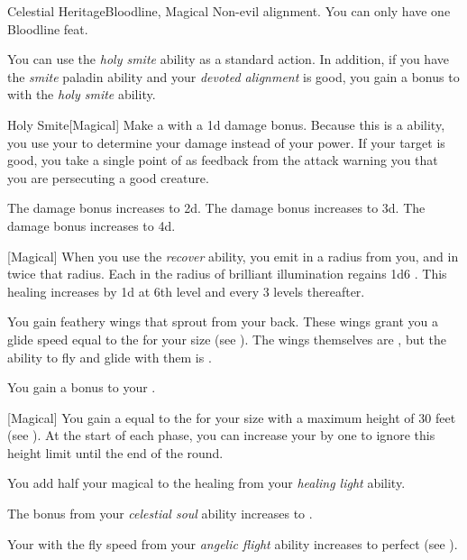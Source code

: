     \begin{feat}{Celestial Heritage}{Bloodline, Magical}
        \featpre Non-evil alignment.
         You can only have one Bloodline feat.

         You can use the \textit{holy smite} ability as a standard action.
        In addition, if you have the \textit{smite} paladin ability and your \textit{devoted alignment} is good, you gain a  bonus to  with the \textit{holy smite} ability.
        \begin{freeability}{Holy Smite}[Magical]
            Make a  with a \plus1d damage bonus.
            Because this is a  ability, you use your   to determine your damage instead of your  power.
            If your target is good, you take a single point of  as feedback from the attack warning you that you are persecuting a good creature.

            \rankline
             The damage bonus increases to \plus2d.
             The damage bonus increases to \plus3d.
             The damage bonus increases to \plus4d.
        \end{freeability}

        [Magical] When you use the \textit{recover} ability, you  emit  in a \medarea radius from you, and  in twice that radius.
        Each  in the radius of brilliant illumination regains 1d6 .
        This healing increases by \plus1d at 6th level and every 3 levels thereafter.

         You gain feathery wings that sprout from your back.
        These wings grant you a glide speed equal to the  for your size (see ).
        The wings themselves are , but the ability to fly and glide with them is .

         You gain a  bonus to your .

        [Magical] You gain a  equal to the  for your size with a maximum height of 30 feet (see ).
        At the start of each phase, you can increase your  by one to ignore this height limit until the end of the round.

         You add half your magical  to the healing from your \textit{healing light} ability.

         The bonus from your \textit{celestial soul} ability increases to .

         Your  with the fly speed from your \textit{angelic flight} ability increases to perfect (see ).
    \end{feat}

